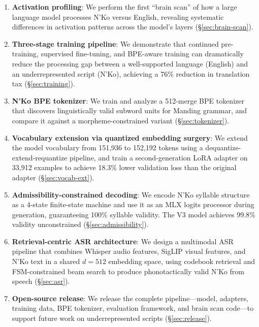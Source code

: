 \documentclass[11pt]{article}
\begin{document}
\begin{enumerate}
\item \textbf{Activation profiling}: We perform the first ``brain scan'' of how a large language model processes N'Ko versus English, revealing systematic differences in activation patterns across the model's layers (\S\ref{sec:brain-scan}).

\item \textbf{Three-stage training pipeline}: We demonstrate that continued pre-training, supervised fine-tuning, and BPE-aware training can dramatically reduce the processing gap between a well-supported language (English) and an underrepresented script (N'Ko), achieving a 76\% reduction in translation tax (\S\ref{sec:training}).

\item \textbf{N'Ko BPE tokenizer}: We train and analyze a 512-merge BPE tokenizer that discovers linguistically valid subword units for Manding grammar, and compare it against a morpheme-constrained variant (\S\ref{sec:tokenizer}).

\item \textbf{Vocabulary extension via quantized embedding surgery}: We extend the model vocabulary from 151,936 to 152,192 tokens using a dequantize-extend-requantize pipeline, and train a second-generation LoRA adapter on 33,912 examples to achieve 18.3\% lower validation loss than the original adapter (\S\ref{sec:vocab-ext}).

\item \textbf{Admissibility-constrained decoding}: We encode N'Ko syllable structure as a 4-state finite-state machine and use it as an MLX logits processor during generation, guaranteeing 100\% syllable validity. The V3 model achieves 99.8\% validity unconstrained (\S\ref{sec:admissibility}).

\item \textbf{Retrieval-centric ASR architecture}: We design a multimodal ASR pipeline that combines Whisper audio features, SigLIP visual features, and N'Ko text in a shared $d=512$ embedding space, using codebook retrieval and FSM-constrained beam search to produce phonotactically valid N'Ko from speech (\S\ref{sec:asr}).

\item \textbf{Open-source release}: We release the complete pipeline---model, adapters, training data, BPE tokenizer, evaluation framework, and brain scan code---to support future work on underrepresented scripts (\S\ref{sec:release}).
\end{enumerate}
\end{document}
